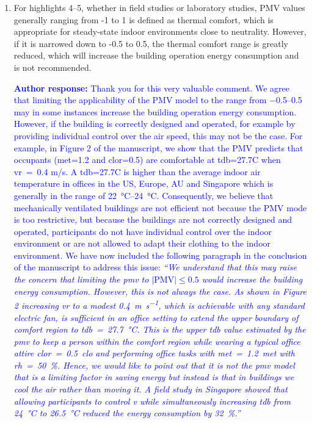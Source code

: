 \documentclass[a4paper, 10pt]{letter}
\newcommand{\response}[1]{\textcolor{blue}{\textbf{Author response:} #1}}
\begin{document}
\begin{letter}
\begin{enumerate}
            \item For highlights 4--5, whether in field studies or laboratory studies, PMV values generally ranging from -1 to 1 is defined as thermal comfort, which is appropriate for steady-state indoor environments close to neutrality.
            However, if it is narrowed down to -0.5 to 0.5, the thermal comfort range is greatly reduced, which will increase the building operation energy consumption and is not recommended.

            \response{
                Thank you for this very valuable comment.
                We agree that limiting the applicability of the PMV model to the range from \numrange{-.5}{.5} may in some instances increase the building operation energy consumption.
                However, if the building is correctly designed and operated, for example by providing individual control over the air speed, this may not be the case.
                For example, in Figure 2 of the manuscript, we show that the PMV predicts that occupants (met=1.2 and \ac{clor}=0.5) are comfortable at \ac{tdb}=27.7C when \ac{vr}~=~0.4 m/s.
                A \ac{tdb}=27.7C is higher than the average indoor air temperature in offices in the US, Europe, AU and Singapore which is generally in the range of \qtyrange{22}{24}{\celsius}.
                Consequently, we believe that mechanically ventilated buildings are not efficient not because the PMV mode is too restrictive, but because the buildings are not correctly designed and operated, participants do not have individual control over the indoor environment or are not allowed to adapt their clothing to the indoor environment.
                We have now included the following paragraph in the conclusion of the manuscript to address this issue: \textit{``We understand that this may raise the concern that limiting the \ac{pmv} to $\lvert \textrm{PMV}\lvert \leq 0.5$ would increase the building energy consumption.
                However, this is not always the case.
                As shown in Figure 2 increasing \ac{vr} to a modest \qty{0.4}{\m\per\s}, which is achievable with any standard electric fan, is sufficient in an office setting to extend the upper boundary of comfort region to \ac{tdb}~=~\qty{27.7}{\celsius}.
                This is the upper \ac{tdb} value estimated by the \ac{pmv} to keep a person within the comfort region while wearing a typical office attire \ac{clor}~=~\qty{0.5}{clo} and performing office tasks with \ac{met}~=~\qty{1.2}{met} with \ac{rh}~=~\qty{50}{\percent}.
                Hence, we would like to point out that it is not the \ac{pmv} model that is a limiting factor in saving energy but instead is that in buildings we cool the air rather than moving it.
                A field study in Singapore showed that allowing participants to control \ac{v} while simultaneously increasing \ac{tdb} from \qty{24}{\celsius} to \qty{26.5}{\celsius} reduced the energy consumption by \qty{32}{\percent}.''}
            }


\end{enumerate}
\end{letter}
\end{document}
